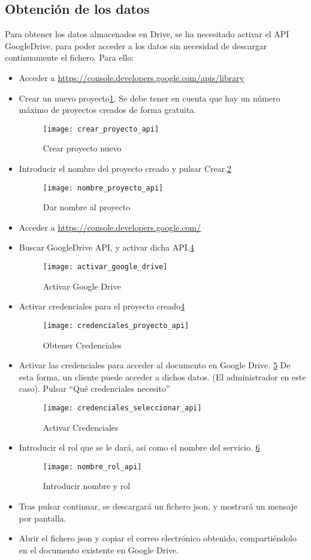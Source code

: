 \subsection{Obtención de los datos}
Para obtener los datos almacenados en Drive, se ha necesitado activar el API GoogleDrive, para poder acceder a los datos sin necesidad de descargar continuamente el fichero. Para ello: 
\begin{itemize}
 
\item Acceder a \url{https://console.developers.google.com/apis/library}
\item Crear un nuevo proyecto\ref{fig:D.1.1}. Se debe tener en cuenta que hay un número máximo de proyectos creados de forma gratuita.
\begin{figure}[h]
\centering
\texttt{[image: crear\_proyecto\_api]}
\caption{Crear proyecto nuevo}
\label{fig:D.1.1}
\end{figure}  
\item Introducir el nombre del proyecto creado y pulsar Crear.\ref{fig:D.1.2} 
\begin{figure}[h]
\centering
\texttt{[image: nombre\_proyecto\_api]}
\caption{Dar nombre al proyecto}
\label{fig:D.1.2}
\end{figure}  
\item Acceder a \url{https://console.developers.google.com/}
\item Buscar GoogleDrive API, y activar dicha API.\ref{fig:D.1.3} 
\begin{figure}[h]
\centering
\texttt{[image: activar\_google\_drive]}
\caption{Activar Google Drive}
\label{fig:D.1.3}
\end{figure}  
\item Activar credenciales para el proyecto creado\ref{fig:D.1.3} 
\begin{figure}[h]
\centering
\texttt{[image: credenciales\_proyecto\_api]}
\caption{Obtener Credenciales}
\label{fig:D.1.3}
\end{figure}  
\item Activar las credenciales para acceder al documento en Google Drive. \ref{fig:D.1.4} De esta forma, un cliente puede acceder a dichos datos. (El administrador en este caso). Pulsar ``Qué credenciales necesito''
\begin{figure}[h]
\centering
\texttt{[image: credenciales\_seleccionar\_api]}
\caption{Activar Credenciales}
\label{fig:D.1.4}
\end{figure}  
\item Introducir el rol que se le dará, así como el nombre del servicio. \ref{fig:D.1.5}
\begin{figure}[h]
\centering
\texttt{[image: nombre\_rol\_api]}
\caption{Introducir nombre y rol}
\label{fig:D.1.5}
\end{figure}
\item Tras pulsar continuar, se descargará un fichero json, y mostrará un mensaje por pantalla. 
\item Abrir el fichero json y copiar el correo electrónico obtenido, compartiéndolo en el documento existente en Google Drive. 
\end{itemize}
